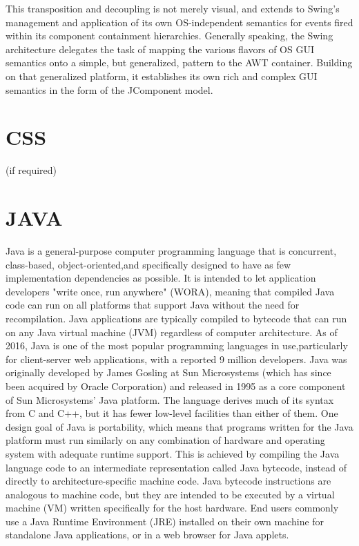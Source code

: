 This transposition and decoupling is not merely visual, and extends to Swing's management and application of its own OS-independent semantics for events fired within its component containment hierarchies. Generally speaking, the Swing architecture delegates the task of mapping the various flavors of OS GUI semantics onto a simple, but generalized, pattern to the AWT container. Building on that generalized platform, it establishes its own rich and complex GUI semantics in the form of the JComponent model.

\section{CSS}
(if required)
\section{JAVA}
Java is a general-purpose computer programming language that is concurrent, class-based, object-oriented,and specifically designed to have as few implementation dependencies as possible. It is intended to let application developers "write once, run anywhere" (WORA), meaning that compiled Java code can run on all platforms that support Java without the need for recompilation. Java applications are typically compiled to bytecode that can run on any Java virtual machine (JVM) regardless of computer architecture. As of 2016, Java is one of the most popular programming languages in use,particularly for client-server web applications, with a reported 9 million developers. Java was originally developed by James Gosling at Sun Microsystems (which has since been acquired by Oracle Corporation) and released in 1995 as a core component of Sun Microsystems' Java platform. The language derives much of its syntax from C and C++, but it has fewer low-level facilities than either of them.
One design goal of Java is portability, which means that programs written for the Java platform must run similarly on any combination of hardware and operating system with adequate runtime support. This is achieved by compiling the Java language code to an intermediate representation called Java bytecode, instead of directly to architecture-specific machine code. Java bytecode instructions are analogous to machine code, but they are intended to be executed by a virtual machine (VM) written specifically for the host hardware. End users commonly use a Java Runtime Environment (JRE) installed on their own machine for standalone Java applications, or in a web browser for Java applets.

